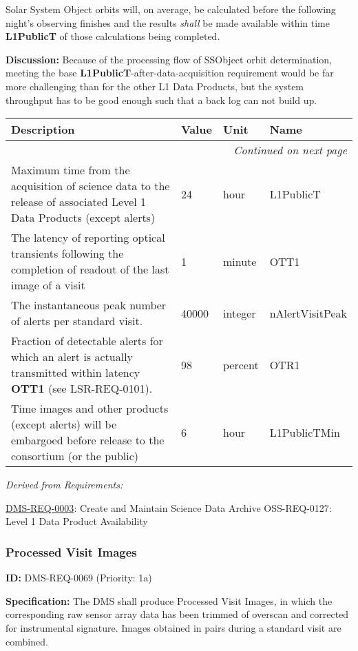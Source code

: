 \documentclass[SE,toc,lsstdraft]{lsstdoc}
\makeatletter
\newcommand{\paramname}[1]{\hspace{0pt}#1}
\newcommand{\unitname}[1]{\hspace{0pt}#1}
\newenvironment{parameters}[0]{%
\setlength\LTleft{0pt}
\setlength\LTright{\fill}
\begin{small}
\begin{longtable}[]{|p{0.49\textwidth}|l|p{0.6in}|p{1.70in}@{}|}

\hline \textbf{Description} & \textbf{Value} & \textbf{Unit} & \textbf{Name} \\ \hline
\endhead

\hline \multicolumn{4}{r}{\emph{Continued on next page}} \\
\endfoot

\hline\hline
\endlastfoot
}{%
\hline
\end{longtable}
\end{small}
}
\makeatother
\begin{document}
Solar System Object orbits will, on average, be calculated before the following night's observing finishes and the results \textit{shall} be made available within time \textbf{L1PublicT} of those calculations being completed.

\textbf{Discussion:}
    Because of the processing flow of SSObject orbit determination, meeting the base \textbf{L1PublicT}-after-data-acquisition requirement would be far more challenging than for the other L1 Data Products, but the system throughput has to be good enough such that a back log can not build up.

\begin{parameters}
    Maximum time from the acquisition of science data to the release of associated Level 1 Data Products (except alerts)
&
24
&
\unitname{%
hour
}
&
\paramname{%
L1PublicT
} \\\hline
The latency of reporting optical transients following the completion of readout of the last image of a visit
&
1
&
\unitname{%
minute
}
&
\paramname{%
OTT1
} \\\hline
The instantaneous peak number of alerts per standard visit.
&
40000
&
\unitname{%
integer
}
&
\paramname{%
nAlertVisitPeak
} \\\hline
Fraction of detectable alerts for which an alert is actually transmitted within latency \textbf{OTT1} (see LSR-REQ-0101).
&
98
&
\unitname{%
percent
}
&
\paramname{%
OTR1
} \\\hline
Time images and other products (except alerts) will be embargoed before release to the consortium (or the public)
&
6
&
\unitname{%
hour
}
&
\paramname{%
L1PublicTMin
} \\\hline
\end{parameters}

\emph{Derived from Requirements:}

\hyperref[DMS-REQ-0003]{DMS-REQ-0003}:
Create and Maintain Science Data Archive \newline
OSS-REQ-0127:
Level 1 Data Product Availability \newline

\subsubsection{Processed Visit Images}

\label{DMS-REQ-0069}
\textbf{ID:} DMS-REQ-0069 (Priority: 1a)

\textbf{Specification: }The DMS shall produce Processed Visit Images, in which the corresponding raw sensor array data has been trimmed of overscan and corrected for instrumental signature. Images obtained in pairs during a standard visit are combined.
\end{document}
